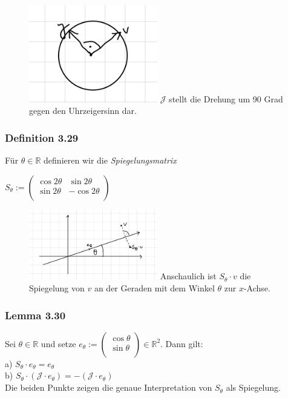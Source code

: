 \documentclass{article}
\begin{document}
\begin{figure}[h]
    \centering
    \includegraphics[width=0.5\textwidth]{Images/3.40.jpeg}
    {$\mathcal{J}$ stellt die Drehung um 90 Grad gegen den Uhrzeigersinn dar.}
\end{figure}

\subsubsection*{Definition 3.29}
Für $\theta \in \mathbb{R}$ definieren wir die \textit{Spiegelungsmatrix} \\
\begin{center}
    $S_\theta := \begin{pmatrix}
        \cos 2\theta & \sin 2\theta \\
        \sin 2\theta & -\cos 2\theta \\
    \end{pmatrix}$
\end{center}
\begin{figure}[h]
    \centering
    \includegraphics[width=0.5\textwidth]{Images/3.29.jpeg}
    {Anschaulich ist $S_\theta \cdot v$ die Spiegelung von $v$ an der Geraden mit dem Winkel $\theta$ zur $x$-Achse.    }
\end{figure}

\subsubsection*{Lemma 3.30}
Sei $\theta \in \mathbb{R}$ und setze $e_\theta := \begin{pmatrix}
    \cos \theta \\
    \sin \theta \\
\end{pmatrix} \in \mathbb{R}^2$. Dann gilt: \\
a) $S_\theta \cdot e_\theta = e_\theta$ \\
b) $S_\theta \cdot (\mathcal{J} \cdot e_\theta) = -(\mathcal{J} \cdot e_\theta)$ \\
Die beiden Punkte zeigen die genaue Interpretation von $S_\theta$ als Spiegelung. \\
\\
\end{document}
